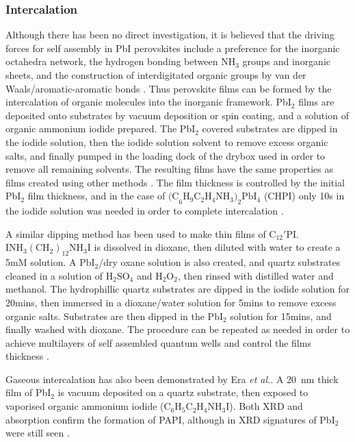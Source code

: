 \subsubsection{Intercalation}
Although there has been no direct investigation, it is believed that the driving forces for self assembly in PbI perovskites include a preference for the inorganic octahedra network, the hydrogen bonding between $\textrm{NH}_3$ groups and inorganic sheets, and the construction of interdigitated organic groups by van der Waals/aromatic-aromatic bonds \cite{Cheng2010}. Thus perovskite films can be formed by the intercalation of organic molecules into the inorganic framework. Pb$\textrm{I}_2$ films are deposited onto substrates by vacuum deposition or spin coating, and a solution of organic ammonium iodide prepared. The Pb$\textrm{I}_2$ covered substrates are dipped in the iodide solution, then the iodide solution solvent to remove excess organic salts, and finally pumped in the loading dock of the drybox used in order to remove all remaining solvents. The resulting films have the same properties as films created using other methods \cite{Liang1998}. The film thickness is controlled by the initial Pb$\textrm{I}_2$ film thickness, and in the case of $\textrm{(C}_6\textrm{H}_9\textrm{C}_2\textrm{H}_4\textrm{NH}_3)_2\textrm{PbI}_4$ (CHPI) only 10s in the iodide solution was needed in order to complete intercalation \cite{Pradeesh2009a}.

A similar dipping method has been used to make thin films of $\textrm{C}_{12}'$PI. $\textrm{INH}_3(\textrm{CH}_2)_{12}\textrm{NH}_3\textrm{I}$ is dissolved in dioxane, then diluted with water to create a 5mM solution. A $\textrm{PbI}_2$/dry oxane solution is also created, and quartz substrates cleaned in a solution of $\textrm{H}_2\textrm{SO}_4$ and $\textrm{H}_2\textrm{O}_2$, then rinsed with distilled water and methanol. The hydrophillic quartz substrates are dipped in the iodide solution for 20mins, then immersed in a dioxane/water solution for 5mins to remove excess organic salts. Substrates are then dipped in the $\textrm{PbI}_2$ solution for 15mins, and finally washed with dioxane. The procedure can be repeated as needed in order to achieve multilayers of self assembled quantum wells and control the films thickness \cite{Matsui2002}.

Gaseous intercalation has also been demonstrated by Era \textit{et al.}. A 20~nm thick film of Pb$\textrm{I}_2$ is vacuum deposited on a quartz substrate, then exposed to vaporised organic ammonium iodide ($\textrm{C}_6\textrm{H}_5\textrm{C}_2\textrm{H}_4\textrm{NH}_3\textrm{I}$). Both XRD and absorption confirm the formation of PAPI, although in XRD signatures of Pb$\textrm{I}_2$ were still seen \cite{Era1998}.

